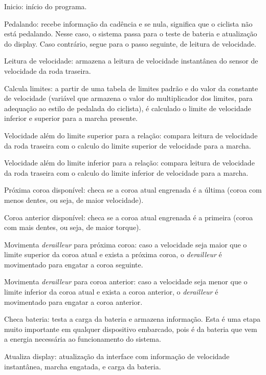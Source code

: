 \documentclass[a4paper,11pt]{article}
\begin{document}
\begin{description*}
  \item[Inicio:] início do programa.
  \item[Pedalando:] recebe informação da cadência e se nula, significa que o
  ciclista não está pedalando. Nesse caso, o sistema passa para o teste de
  bateria  e atualização do display. Caso contrário, segue para o passo
  seguinte, de  leitura de velocidade.
  \item[Leitura de velocidade:] armazena a leitura de velocidade instantânea do
  sensor de velocidade da roda traseira.
  \item[Calcula limites:] a partir de uma tabela de limites padrão e do valor da
  constante de velocidade (variável que armazena o valor do multiplicador dos
  limites, para adequação ao estilo de pedalada do ciclista), é calculado o
  limite de velocidade inferior e superior para a marcha presente.
  \item[Velocidade além do limite superior para a relação:] compara leitura de
  velocidade da roda traseira com o calculo do limite superior de velocidade
  para a marcha.
  \item[Velocidade além do limite inferior para a relação:] compara leitura de
  velocidade da roda traseira com o calculo do limite inferior de velocidade
  para a marcha.
  \item[Próxima coroa disponível:] checa se a coroa atual engrenada é a última
  (coroa
  com menos dentes, ou seja, de maior velocidade).
  \item[Coroa anterior disponível:] checa se a coroa atual engrenada é a
  primeira (coroa com mais dentes, ou seja, de maior torque).
  \item[Movimenta \textit{derailleur} para próxima coroa:] caso a velocidade
  seja  maior que o limite superior da coroa atual e exista a próxima coroa, o
  \textit{derailleur}  é movimentado para engatar a coroa seguinte.
  \item[Movimenta \textit{derailleur} para coroa anterior:] caso a velocidade
  seja  menor que o limite inferior da coroa atual e exista a coroa anterior, o
  \textit{derailleur}  é movimentado para engatar a coroa anterior.
  \item[Checa bateria:] testa a carga da bateria e armazena informação. Esta é
  uma etapa muito importante em qualquer dispositivo embarcado, pois é da
  bateria que vem a energia necessária ao funcionamento do sistema.
  \item[Atualiza display:] atualização da interface com informação de velocidade
  instantânea, marcha engatada, e carga da bateria.
\end{description*}
\end{document}
